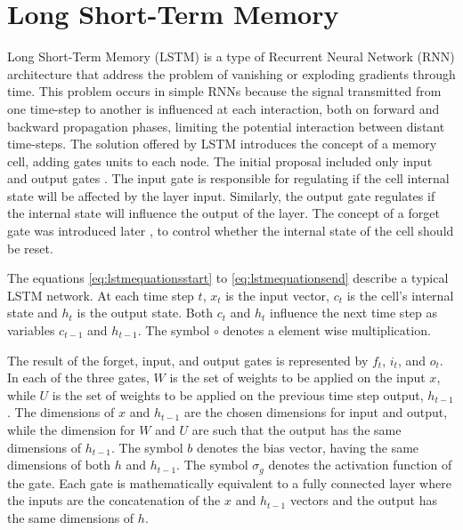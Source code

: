 \section{\label{sec:lstm}Long Short-Term Memory}
Long Short-Term Memory\cite{hochreiter_long_1997} (LSTM) is a type of Recurrent Neural Network (RNN) architecture that address the problem of vanishing or exploding gradients through time. This problem occurs in simple RNNs because the signal transmitted from one time-step to another is influenced at each interaction, both on forward and backward propagation phases, limiting the potential interaction between distant time-steps. The solution offered by LSTM introduces the concept of a memory cell, adding gates units to each node. The initial proposal included only input and output gates \cite{hochreiter_long_1997}.
The input gate is responsible for regulating if the cell internal state will be affected by the layer input. Similarly, the output gate regulates if the internal state will influence the output of the layer. The concept of a forget gate was introduced later \cite{gers_learning_1999}, to control whether the internal state of the cell should be reset.

The equations \eqref{eq:lstmequationsstart} to \eqref{eq:lstmequationsend} describe a typical LSTM network. At each time step $t$, $x_t$ is the input vector, $c_t$ is the cell's internal state and $h_t$ is the output state. Both $c_t$ and $h_t$ influence the next time step as variables $c_{t-1}$ and $h_{t-1}$. The symbol $\circ$ denotes a element wise multiplication.


The result of the forget, input, and output gates is represented by $f_t$, $i_t$, and $o_t$.
In each of the three gates, $W$ is the set of weights to be applied on the input $x$, while $U$ is the set of weights to be applied on the previous time step output, $h_{t-1}$. The dimensions of $x$ and $h_{t-1}$ are the chosen dimensions for input and output, while the dimension for $W$ and $U$ are such that the output has the same dimensions of $h_{t-1}$.  The symbol $b$ denotes the bias vector, having the same dimensions of both $h$ and $h_{t-1}$. The symbol $\sigma_g$ denotes the activation function of the gate. Each gate is mathematically equivalent to a fully connected layer where the inputs are the concatenation of the $x$ and $h_{t-1}$ vectors and the output has the same dimensions of $h$.

